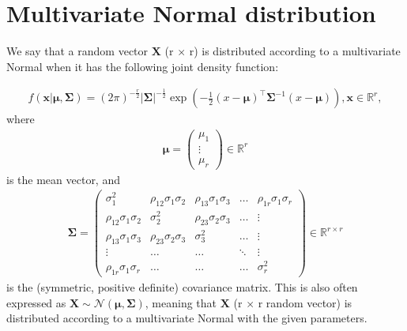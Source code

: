 \section{Multivariate Normal distribution}\label{sec:multnormaldist}

We say that a random vector $\bm{X}$ (r $\times$ r) is distributed according to a multivariate Normal when it has the following joint density function\cite[p. 59]{izenman_modern_2008}:
\begin{definition}
    \begin{align}
        f(\bm{x}| \bm{\mu}, \bm{\Sigma}) = (2\pi)^{-\frac{r}{2}} \left|\bm{\Sigma}\right|^{-\frac{1}{2}} \exp\left(-\frac{1}{2}(x-\bm{\mu})^\top \bm{\Sigma}^{-1} (x-\bm{\mu})\right),
        \bm{x} \in \mathbb{R}^r,
    \end{align}
    where
    \begin{align}
        \bm{\mu} =
        \begin{pmatrix}
            \mu_1  \\
            \vdots \\
            \mu_r
        \end{pmatrix}
        \in \mathbb{R}^r
    \end{align}
    is the mean vector, and
    \begin{align*}
        \bm{\Sigma} =
        \begin{pmatrix}
            \sigma_1^2                & \rho_{12}\sigma_1\sigma_2 & \rho_{13}\sigma_1\sigma_3 & \ldots & \rho_{1r}\sigma_1\sigma_r \\
            \rho_{12}\sigma_1\sigma_2 & \sigma_2^2                & \rho_{23}\sigma_2\sigma_3 & \ldots & \vdots                    \\
            \rho_{13}\sigma_1\sigma_3 & \rho_{23}\sigma_2\sigma_3 & \sigma_3^2                & \ldots & \vdots                    \\
            \vdots                    & \ldots                    & \ldots                    & \ddots & \vdots                    \\
            \rho_{1r}\sigma_1\sigma_r & \ldots                    & \ldots                    & \ldots & \sigma_r^2
        \end{pmatrix}
        \in \mathbb{R}^{r\times r}
    \end{align*}
    is the (symmetric, positive definite) covariance matrix.
    This is also often expressed as $\bm{X} \sim \mathcal{N}(\bm{\mu}, \bm{\Sigma})$, meaning that $\bm{X}$ (r $\times$ r random vector) is distributed according to a multivariate Normal with the given parameters.
\end{definition}






 
